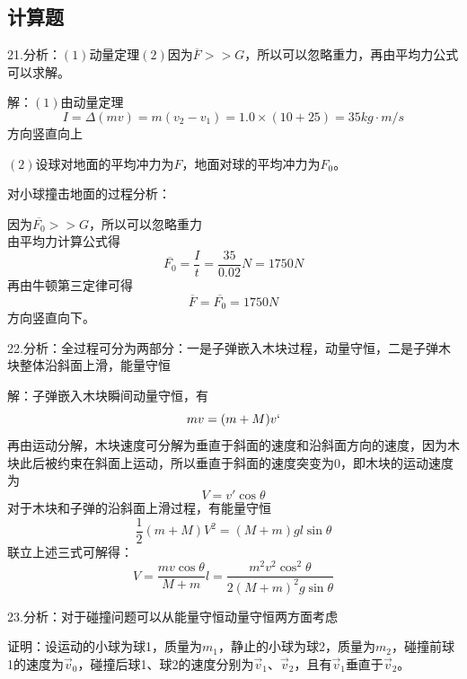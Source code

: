 \documentclass[blue, pad]{./templete/qyxfnote}
\begin{document}
		\subsection{计算题}
			21.分析：$(1)$动量定理$(2)$因为$\overline{F}>>G$，所以可以忽略重力，再由平均力公式可以求解。
			
			解：$(1)$由动量定理
			\begin{equation*}
			I=\Delta(mv)=m(v_2-v_1)=1.0\times(10+25)=35kg\cdot m/s
			\end{equation*}
			方向竖直向上
			
			$(2)$设球对地面的平均冲力为$F$，地面对球的平均冲力为$F_0$。
			
			对小球撞击地面的过程分析：
			
			因为$\overline{F_0}>>G$，所以可以忽略重力\\
			由平均力计算公式得
			\begin{equation*}
			\overline{F_0}=\frac{I}{t}=\frac{35}{0.02}N=1750N
			\end{equation*}
			再由牛顿第三定律可得
			\begin{equation*}
			\overline{F}=\overline{F_0}=1750N
			\end{equation*}
			方向竖直向下。
			
			22.分析：全过程可分为两部分：一是子弹嵌入木块过程，动量守恒，二是子弹木块整体沿斜面上滑，能量守恒
			
			解：子弹嵌入木块瞬间动量守恒，有
			\begin{equation*}
			mv=(m+M)v`
			\end{equation*}
			再由运动分解，木块速度可分解为垂直于斜面的速度和沿斜面方向的速度，因为木块此后被约束在斜面上运动，所以垂直于斜面的速度突变为$0$，即木块的运动速度为
			\begin{equation*}
			V=v'\cos\theta
			\end{equation*}
			对于木块和子弹的沿斜面上滑过程，有能量守恒
			\begin{equation*}
			\frac{1}{2}(m+M)V^2=(M+m)gl\sin\theta
			\end{equation*}
			联立上述三式可解得：
			\begin{equation*}
			V=\frac{mv\cos\theta}{M+m}
			l=\frac{m^2v^2\cos^2\theta}{2(M+m)^2g\sin\theta}
			\end{equation*}
			
			23.分析：对于碰撞问题可以从能量守恒动量守恒两方面考虑
			
			证明：设运动的小球为球1，质量为$m_1$，静止的小球为球2，质量为$m_2$，碰撞前球1的速度为$\vec{v}_0$，碰撞后球1、球2的速度分别为$\vec{v}_1、\vec{v}_2$，且有$\vec{v}_1$垂直于$\vec{v}_2$。
			
\end{document}
